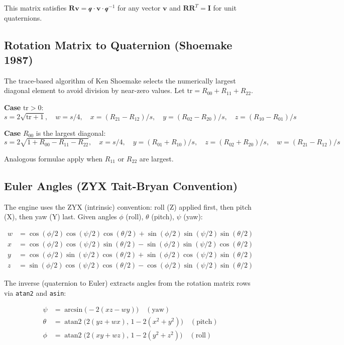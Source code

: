 This matrix satisfies $\mathbf{R}\mathbf{v} = \mathcal{q} \cdot \mathbf{v} \cdot \mathcal{q}^{-1}$
for any vector $\mathbf{v}$ and $\mathbf{R}\mathbf{R}^T = \mathbf{I}$
for unit quaternions.

\subsection{Rotation Matrix to Quaternion (Shoemake 1987)}

The trace-based algorithm of Ken Shoemake selects the numerically largest
diagonal element to avoid division by near-zero values.
Let $\text{tr} = R_{00} + R_{11} + R_{22}$.

\textbf{Case} $\text{tr} > 0$:
\[
s = 2\sqrt{\text{tr}+1}, \quad
w = s/4, \quad
x = (R_{21}-R_{12})/s, \quad
y = (R_{02}-R_{20})/s, \quad
z = (R_{10}-R_{01})/s
\]

\textbf{Case} $R_{00}$ is the largest diagonal:
\[
s = 2\sqrt{1+R_{00}-R_{11}-R_{22}}, \quad
x = s/4, \quad
y = (R_{01}+R_{10})/s, \quad
z = (R_{02}+R_{20})/s, \quad
w = (R_{21}-R_{12})/s
\]

Analogous formulae apply when $R_{11}$ or $R_{22}$ are largest.

\subsection{Euler Angles (ZYX Tait-Bryan Convention)}

The engine uses the ZYX (intrinsic) convention: roll (Z) applied first,
then pitch (X), then yaw (Y) last.
Given angles $\phi$ (roll), $\theta$ (pitch), $\psi$ (yaw):

\begin{align}
  w &= \cos(\phi/2)\cos(\psi/2)\cos(\theta/2) + \sin(\phi/2)\sin(\psi/2)\sin(\theta/2) \\
  x &= \cos(\phi/2)\cos(\psi/2)\sin(\theta/2) - \sin(\phi/2)\sin(\psi/2)\cos(\theta/2) \\
  y &= \cos(\phi/2)\sin(\psi/2)\cos(\theta/2) + \sin(\phi/2)\cos(\psi/2)\sin(\theta/2) \\
  z &= \sin(\phi/2)\cos(\psi/2)\cos(\theta/2) - \cos(\phi/2)\sin(\psi/2)\sin(\theta/2)
\end{align}

The inverse (quaternion to Euler) extracts angles from the rotation matrix
rows via \texttt{atan2} and \texttt{asin}:

\begin{align}
  \psi  &= \arcsin\!\bigl(-2(xz - wy)\bigr) \quad (\text{yaw}) \\
  \theta &= \operatorname{atan2}\!\bigl(2(yz+wx),\, 1-2(x^2+y^2)\bigr) \quad (\text{pitch}) \\
  \phi  &= \operatorname{atan2}\!\bigl(2(xy+wz),\, 1-2(y^2+z^2)\bigr) \quad (\text{roll})
\end{align}


